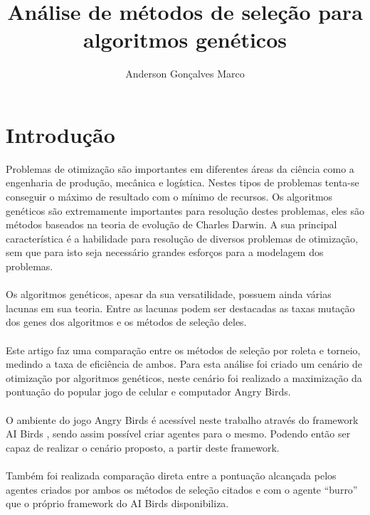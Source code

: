 \documentclass[10pt,a4paper]{article}
\title{Análise de métodos de seleção para algoritmos genéticos}
\author{Anderson Gonçalves Marco}
\begin{document}
\date{}
\maketitle
\section{Introdução}
Problemas de otimização são importantes em diferentes áreas da ciência como a engenharia de produção, mecânica e logística. Nestes tipos de problemas tenta-se conseguir o máximo de resultado com o mínimo de recursos. Os algoritmos genéticos são extremamente importantes para  resolução destes problemas, eles são métodos baseados na teoria de evolução de Charles Darwin. A sua principal característica é a habilidade para resolução de diversos problemas de otimização, sem que para isto seja necessário grandes esforços para a modelagem dos problemas.\\ \\
Os algoritmos genéticos, apesar da sua versatilidade, possuem ainda várias lacunas em sua teoria. Entre as lacunas podem ser destacadas as taxas mutação dos genes dos algoritmos e os métodos de seleção deles.\\ \\
Este artigo faz uma comparação entre os métodos de seleção por roleta e torneio, medindo a taxa de eficiência de ambos. Para esta análise foi criado um cenário de otimização por algoritmos genéticos, neste cenário foi realizado a maximização da pontuação do popular jogo de celular e computador Angry Birds. \\ \\
O ambiente do jogo Angry Birds é acessível neste trabalho através do framework AI Birds \cite{aiBirds}, sendo assim possível criar agentes para o mesmo. Podendo então ser capaz de realizar o cenário proposto, a partir deste framework. \\ \\ 
Também foi realizada comparação direta entre a pontuação alcançada pelos agentes criados por ambos os métodos de seleção citados e com o agente ``burro'' que o próprio framework do AI Birds disponibiliza.

\end{document}

